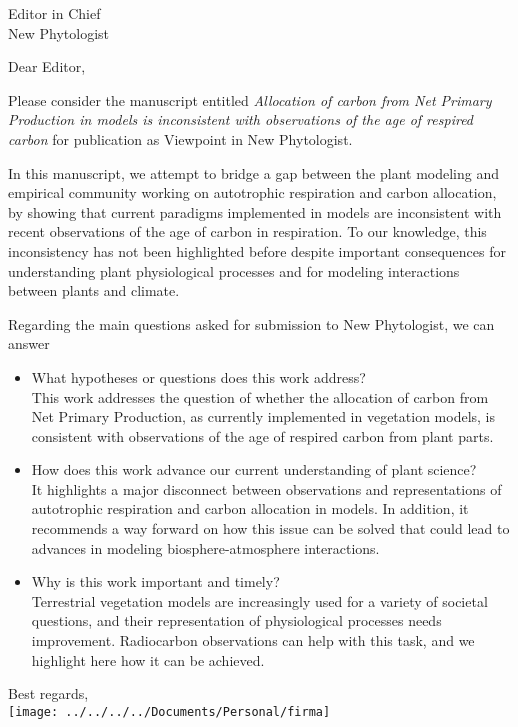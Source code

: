 \documentclass[11pt]{bgcletter}
\begin{document}
\begin{letter}{Editor in Chief\\
   New Phytologist 
   }
\opening{Dear Editor,}
Please consider the manuscript entitled \emph{Allocation of carbon from Net Primary Production in models is inconsistent with observations of the age of respired carbon} for publication as Viewpoint in New Phytologist.

In this manuscript, we attempt to bridge a gap between the plant modeling and empirical community working on autotrophic respiration and carbon allocation, by showing that current paradigms implemented in models are inconsistent with recent observations of the age of carbon in respiration. To our knowledge, this inconsistency has not been highlighted before despite important consequences for understanding plant physiological processes and for modeling interactions between plants and climate.

Regarding the main questions asked for submission to New Phytologist, we can answer
\begin{itemize}
\item What hypotheses or questions does this work address? \\
 This work addresses the question of whether the allocation of carbon from Net Primary Production, as currently implemented in vegetation models, is consistent with observations of the age of respired carbon from plant parts.
\item How does this work advance our current understanding of plant science? \\
 It highlights a major disconnect between observations and representations of autotrophic respiration and carbon allocation in models. In addition, it recommends a way forward on how this issue can be solved that could lead to advances in modeling biosphere-atmosphere interactions. 
\item Why is this work important and timely? \\
 Terrestrial vegetation models are increasingly used for a variety of societal questions, and their representation of physiological processes needs improvement. Radiocarbon observations can help with this task, and we highlight here how it can be achieved.
\end{itemize}

 \closing{Best regards, \\
 \texttt{[image: ../../../../Documents/Personal/firma]}} 
 \end{letter}

 
\end{document}
